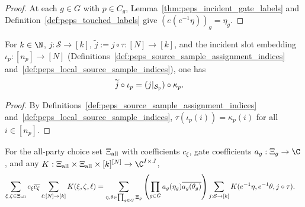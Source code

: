 \begin{proof}
    \leanok
    At each $g\in G$ with $p\in C_g$, Lemma~\ref{thm:peps_incident_gate_labels} and Definition~\ref{def:peps_touched_labels} give $(e(e^{-1}\eta))_g=\eta_g$.
\end{proof}

\begin{lemma}
    \label{thm:peps_reindexed_incident_samples}
    \leanok
    For $k\in\N$, $j:\mathcal S\to[k]$, $\widetilde j:=j\circ\tau:[N]\to[k]$, and the incident slot embedding $\iota_p:[n_p]\to[N]$ (Definitions~\ref{def:peps_source_sample_assignment_indices} and~\ref{def:peps_local_source_sample_indices}), one has
    \begin{align}
        \widetilde j\circ\iota_p & = (j|_{\mathcal S_p})\circ\kappa_p. \notag
    \end{align}
\end{lemma}

\begin{proof}
    \leanok
    By Definitions~\ref{def:peps_source_sample_assignment_indices} and~\ref{def:peps_local_source_sample_indices}, $\tau(\iota_p(i))=\kappa_p(i)$ for all $i\in[n_p]$.
\end{proof}

\begin{lemma}
    \label{thm:peps_joint_gate_sample_sum}
    \leanok
    For the all-party choice set $\Xi_{\rm all}$ with coefficients $c_\xi$, gate coefficients $a_g:\Xi_g\to\C$, and any $K:\Xi_{\rm all}\times\Xi_{\rm all}\times[k]^{[N]}\to\C^{I\times J}$,
    \begin{align}
        \sum_{\xi,\zeta\in\Xi_{\rm all}}c_\xi\overline{c_\zeta}
        \sum_{\ell:[N]\to[k]}K(\xi,\zeta,\ell)
         & =\sum_{\eta,\theta\in\prod_{g\in G}\Xi_g}
        \left(\prod_{g\in G}a_g(\eta_g)\overline{a_g(\theta_g)}\right)
        \sum_{j:\mathcal S\to[k]}K(e^{-1}\eta,e^{-1}\theta,j\circ\tau).
        \label{eq:peps_joint_gate_sample_sum}
    \end{align}
\end{lemma}

